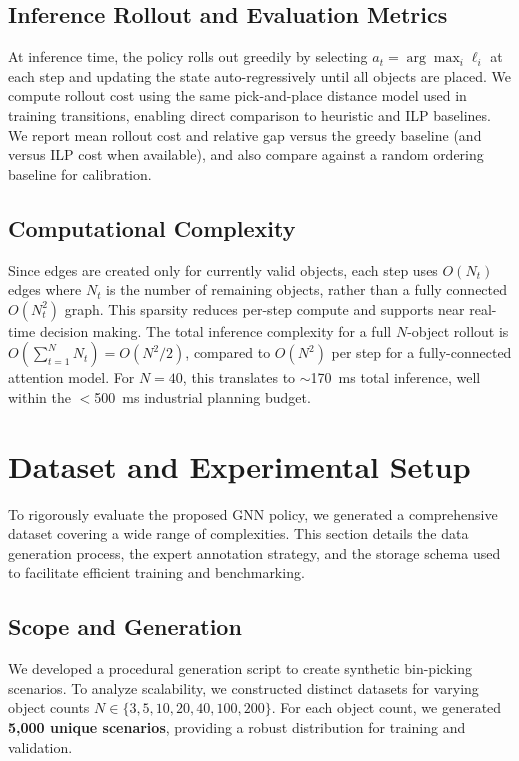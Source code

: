\documentclass[conference]{IEEEtran}
\begin{document}
\subsection{Inference Rollout and Evaluation Metrics}
At inference time, the policy rolls out greedily by selecting $a_t = \arg\max_i \ell_i$ at each step and updating the state auto-regressively until all objects are placed.
We compute rollout cost using the same pick-and-place distance model used in training transitions, enabling direct comparison to heuristic and ILP baselines.
We report mean rollout cost and relative gap versus the greedy baseline (and versus ILP cost when available), and also compare against a random ordering baseline for calibration.

\subsection{Computational Complexity}
Since edges are created only for currently valid objects, each step uses $O(N_t)$ edges where $N_t$ is the number of remaining objects, rather than a fully connected $O(N_t^2)$ graph.
This sparsity reduces per-step compute and supports near real-time decision making. The total inference complexity for a full $N$-object rollout is $O(\sum_{t=1}^{N} N_t) = O(N^2/2)$, compared to $O(N^2)$ per step for a fully-connected attention model. For $N=40$, this translates to $\sim$170~ms total inference, well within the $<$500~ms industrial planning budget.

\section{Dataset and Experimental Setup}\label{sec:data}

To rigorously evaluate the proposed GNN policy, we generated a comprehensive dataset covering a wide range of complexities. This section details the data generation process, the expert annotation strategy, and the storage schema used to facilitate efficient training and benchmarking.

\subsection{Scope and Generation}
We developed a procedural generation script to create synthetic bin-picking scenarios. To analyze scalability, we constructed distinct datasets for varying object counts $N \in \{3, 5, 10, 20, 40, 100, 200\}$. For each object count, we generated \textbf{5,000 unique scenarios}, providing a robust distribution for training and validation.
\end{document}
